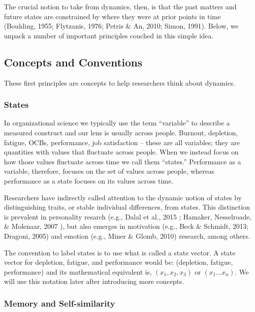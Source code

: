 \documentclass[english,,man]{apa6}
\begin{document}
The crucial notion to take from dynamics, then, is that the past matters and future states are constrained by where they were at prior points in time (Boulding, 1955; Flytzanis, 1976; Petris \& An, 2010; Simon, 1991). Below, we unpack a number of important principles couched in this simple idea.

\hypertarget{concepts-and-conventions}{%
\subsection{Concepts and Conventions}\label{concepts-and-conventions}}

These first principles are concepts to help researchers think about dynamics.

\hypertarget{states}{%
\subsubsection{States}\label{states}}

In organizational science we typically use the term \enquote{variable} to describe a measured construct and our lens is usually across people. Burnout, depletion, fatigue, OCBs, performance, job satisfaction -- these are all variables; they are quantities with values that fluctuate across people. When we instead focus on how those values fluctuate across time we call them \enquote{states.} Performance as a variable, therefore, focuses on the set of values across people, whereas performance as a state focuses on its values across time.

Researchers have indirectly called attention to the dynamic notion of states by distinguishing traits, or stable individual differences, from states. This distinction is prevalent in personality resarch (e.g., Dalal et al., 2015 ; Hamaker, Nesselroade, \& Molenaar, 2007 ), but also emerges in motivation (e.g., Beck \& Schmidt, 2013; Dragoni, 2005) and emotion (e.g., Miner \& Glomb, 2010) research, among others.

The convention to label states is to use what is called a state vector. A state vector for depletion, fatigue, and performance would be: (depletion, fatigue, performance) and its mathematical equivalent is, \((x_1, x_2, x_3)\) or \((x_1 ...x_n)\). We will use this notation later after introducing more concepts.

\hypertarget{memory-and-self-similarity}{%
\subsubsection{Memory and Self-similarity}\label{memory-and-self-similarity}}
\end{document}
